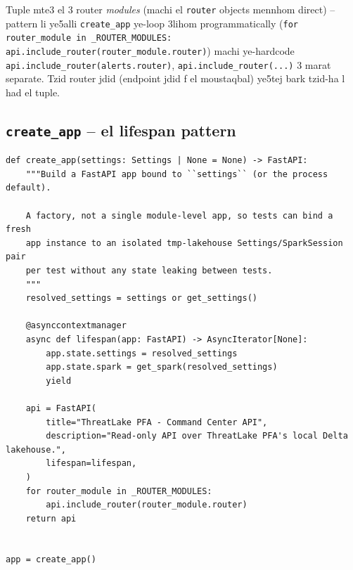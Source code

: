 \documentclass[11pt,a4paper]{report}
\DeclareRobustCommand{\code}[1]{\texttt{#1}}
\begin{document}
Tuple mte3 el 3 router \emph{modules} (machi el \code{router} objects
mennhom direct) -- pattern li ye5alli \code{create\_app} ye-loop 3lihom
programmatically (\code{for router\_module in \_ROUTER\_MODULES:
api.include\_router(router\_module.router)}) machi ye-hardcode
\code{api.include\_router(alerts.router)}, \code{api.include\_router(...)}
3 marat separate. Tzid router jdid (endpoint jdid f el moustaqbal) ye5tej
bark tzid-ha l had el tuple.

\subsection{\code{create\_app} -- el lifespan pattern}

\begin{lstlisting}[style=pystyle]
def create_app(settings: Settings | None = None) -> FastAPI:
    """Build a FastAPI app bound to ``settings`` (or the process default).

    A factory, not a single module-level app, so tests can bind a fresh
    app instance to an isolated tmp-lakehouse Settings/SparkSession pair
    per test without any state leaking between tests.
    """
    resolved_settings = settings or get_settings()

    @asynccontextmanager
    async def lifespan(app: FastAPI) -> AsyncIterator[None]:
        app.state.settings = resolved_settings
        app.state.spark = get_spark(resolved_settings)
        yield

    api = FastAPI(
        title="ThreatLake PFA - Command Center API",
        description="Read-only API over ThreatLake PFA's local Delta lakehouse.",
        lifespan=lifespan,
    )
    for router_module in _ROUTER_MODULES:
        api.include_router(router_module.router)
    return api


app = create_app()
\end{lstlisting}
\end{document}
